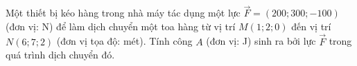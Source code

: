 \begin{ex}
Một thiết bị kéo hàng trong nhà máy tác dụng một lực $\overrightarrow{F}=(200;300;-100)$ (đơn vị: N) để làm dịch chuyển một toa hàng từ vị trí $M(1;2;0)$ đến vị trí $N(6;7;2)$ (đơn vị tọa độ: mét). Tính công $A$ (đơn vị: J) sinh ra bởi lực $\overrightarrow{F}$ trong quá trình dịch chuyển đó.
\end{ex}
